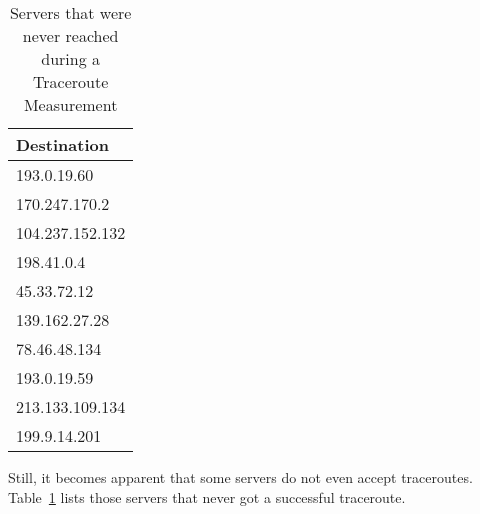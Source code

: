 \begin{table}
	\footnotesize
	\caption{Servers that were never reached during a Traceroute Measurement}
	\label{fig:unreachable-servers}
	\begin{tabular}{l}
		\toprule
		Destination     \\
		\midrule
		193.0.19.60     \\
		170.247.170.2   \\
		104.237.152.132 \\
		198.41.0.4      \\
		45.33.72.12     \\
		139.162.27.28   \\
		78.46.48.134    \\
		193.0.19.59     \\
		213.133.109.134 \\
		199.9.14.201    \\
		\bottomrule
	\end{tabular}
\end{table}

Still, it becomes apparent that some servers do not even accept traceroutes.
Table~\ref{fig:unreachable-servers} lists those servers that never got a
successful traceroute.

